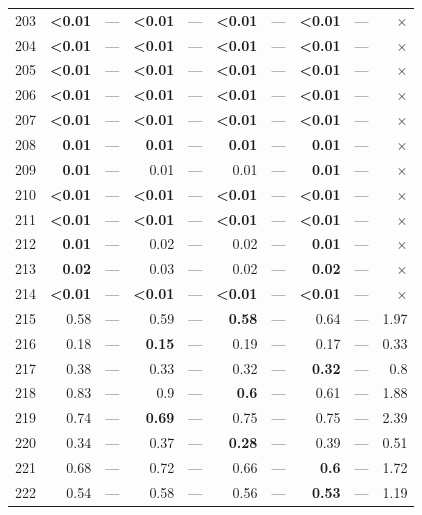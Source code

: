 \begin{longtable}{lr@{\hskip 4pt}l@{\hskip 12pt}r@{\hskip 4pt}l@{\hskip 12pt}r@{\hskip 4pt}l@{\hskip 12pt}r@{\hskip 4pt}l@{\hskip 12pt}r}
203 & \textbf{<0.01} & --- & \textbf{<0.01} & --- & \textbf{<0.01} & --- & \textbf{<0.01} & --- & $\times$ \\
204 & \textbf{<0.01} & --- & \textbf{<0.01} & --- & \textbf{<0.01} & --- & \textbf{<0.01} & --- & $\times$ \\
205 & \textbf{<0.01} & --- & \textbf{<0.01} & --- & \textbf{<0.01} & --- & \textbf{<0.01} & --- & $\times$ \\
206 & \textbf{<0.01} & --- & \textbf{<0.01} & --- & \textbf{<0.01} & --- & \textbf{<0.01} & --- & $\times$ \\
207 & \textbf{<0.01} & --- & \textbf{<0.01} & --- & \textbf{<0.01} & --- & \textbf{<0.01} & --- & $\times$ \\
208 & \textbf{0.01} & --- & \textbf{0.01} & --- & \textbf{0.01} & --- & \textbf{0.01} & --- & $\times$ \\
209 & \textbf{0.01} & --- & 0.01 & --- & 0.01 & --- & \textbf{0.01} & --- & $\times$ \\
210 & \textbf{<0.01} & --- & \textbf{<0.01} & --- & \textbf{<0.01} & --- & \textbf{<0.01} & --- & $\times$ \\
211 & \textbf{<0.01} & --- & \textbf{<0.01} & --- & \textbf{<0.01} & --- & \textbf{<0.01} & --- & $\times$ \\
212 & \textbf{0.01} & --- & 0.02 & --- & 0.02 & --- & \textbf{0.01} & --- & $\times$ \\
213 & \textbf{0.02} & --- & 0.03 & --- & 0.02 & --- & \textbf{0.02} & --- & $\times$ \\
214 & \textbf{<0.01} & --- & \textbf{<0.01} & --- & \textbf{<0.01} & --- & \textbf{<0.01} & --- & $\times$ \\
215 & 0.58 & --- & 0.59 & --- & \textbf{0.58} & --- & 0.64 & --- & 1.97 \\
216 & 0.18 & --- & \textbf{0.15} & --- & 0.19 & --- & 0.17 & --- & 0.33 \\
217 & 0.38 & --- & 0.33 & --- & 0.32 & --- & \textbf{0.32} & --- & 0.8 \\
218 & 0.83 & --- & 0.9 & --- & \textbf{0.6} & --- & 0.61 & --- & 1.88 \\
219 & 0.74 & --- & \textbf{0.69} & --- & 0.75 & --- & 0.75 & --- & 2.39 \\
220 & 0.34 & --- & 0.37 & --- & \textbf{0.28} & --- & 0.39 & --- & 0.51 \\
221 & 0.68 & --- & 0.72 & --- & 0.66 & --- & \textbf{0.6} & --- & 1.72 \\
222 & 0.54 & --- & 0.58 & --- & 0.56 & --- & \textbf{0.53} & --- & 1.19 \\

\end{longtable}
